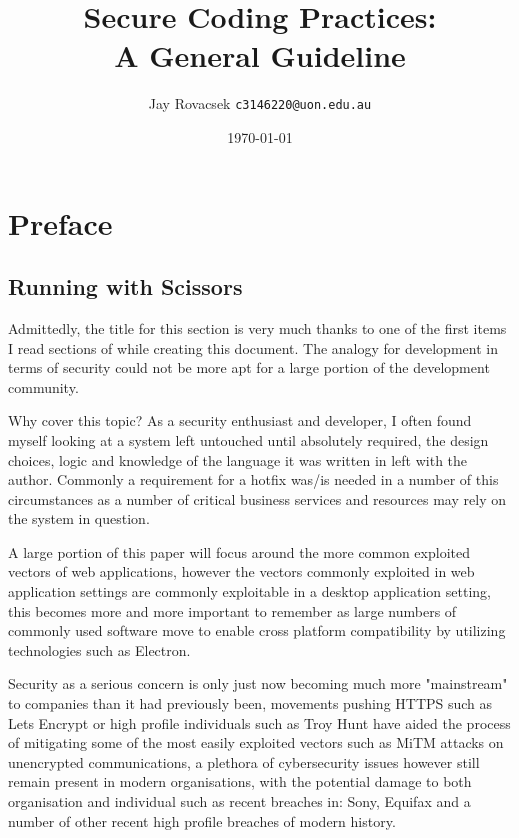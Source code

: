 \documentclass[
    a4paper,
    12pt,
    headings=normal
]{article}
\title{Secure Coding Practices:
    \protect\\A General Guideline}
\author{
        Jay Rovacsek
        \texttt{c3146220@uon.edu.au}\\
    }
\date{\today}
\begin{document}
    \begin{titlingpage}
        \maketitle
    \end{titlingpage}
    \newpage

    \tableofcontents

    \newpage

    \section{Preface}
    \subsection{Running with Scissors}
        Admittedly, the title for this section is very much thanks to one of the first
        items\cite{Seacord} I read sections of while creating this document. The analogy for 
        development in terms of security could not be more apt for a large portion of the development 
        community.

        Why cover this topic? As a security enthusiast and developer, I often found myself 
        looking at a system left untouched until absolutely required, the design choices, logic and
        knowledge of the language it was written in left with the author. Commonly a requirement 
        for a hotfix was/is needed in a number of this circumstances as a number of critical 
        business services and resources may rely on the system in question.

        A large portion of this paper will focus around the more common exploited vectors of 
        web applications, however the vectors commonly exploited in web application settings are
        commonly exploitable in a desktop application setting, this becomes more and more important 
        to remember as large numbers of commonly used software move to enable cross platform compatibility 
        by utilizing technologies such as Electron\cite{ElectronFramework}.

        Security as a serious concern is only just now becoming much more "mainstream" to companies than 
        it had previously been, movements pushing HTTPS such as Lets Encrypt\cite{LetsEncrypt} or high profile
        individuals such as Troy Hunt\cite{TroyHuntHttpsIsEasy} have aided the process of mitigating 
        some of the most easily exploited vectors such as MiTM attacks on unencrypted communications, a 
        plethora of cybersecurity issues however still remain present in modern organisations, with the 
        potential damage to both organisation and individual such as recent breaches in: Sony\cite{SonyBreach},
        Equifax\cite{EquifaxBreach} and a number of other recent high profile breaches of modern history.
\end{document}
